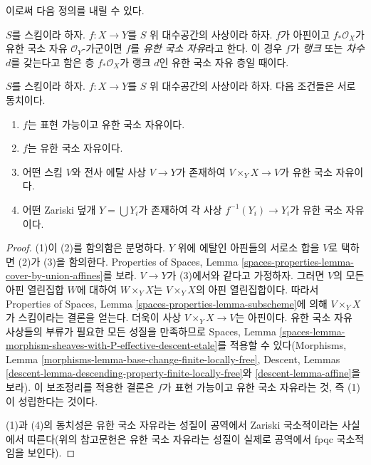 \noindent
이로써 다음 정의를 내릴 수 있다.

\begin{definition}
\label{definition-finite-locally-free}
$S$를 스킴이라 하자.
$f : X \to Y$를 $S$ 위 대수공간의 사상이라 하자.
$f$가 아핀이고 $f_*\mathcal{O}_X$가 유한 국소 자유
$\mathcal{O}_Y$-가군이면 $f$를 {\it 유한 국소 자유}라고 한다.
이 경우 $f$가 {\it 랭크} 또는 {\it 차수} $d$를 갖는다고 함은 층
$f_*\mathcal{O}_X$가 랭크 $d$인 유한 국소 자유 층일 때이다.
\end{definition}

\begin{lemma}
\label{lemma-finite-locally-free-local}
$S$를 스킴이라 하자.
$f : X \to Y$를 $S$ 위 대수공간의 사상이라 하자.
다음 조건들은 서로 동치이다.
\begin{enumerate}
\item $f$는 표현 가능이고 유한 국소 자유이다.
\item $f$는 유한 국소 자유이다.
\item 어떤 스킴 $V$와 전사 에탈 사상 $V \to Y$가 존재하여
$V \times_Y X \to V$가 유한 국소 자유이다.
\item 어떤 Zariski 덮개 $Y = \bigcup Y_i$가 존재하여 각 사상
$f^{-1}(Y_i) \to Y_i$가 유한 국소 자유이다.
\end{enumerate}
\end{lemma}

\begin{proof}
(1)이 (2)를 함의함은 분명하다. $Y$ 위에 에탈인 아핀들의 서로소 합을
$V$로 택하면 (2)가 (3)을 함의한다. Properties of Spaces, Lemma
\ref{spaces-properties-lemma-cover-by-union-affines}를 보라.
$V \to Y$가 (3)에서와 같다고 가정하자. 그러면 $V$의 모든 아핀 열린집합
$W$에 대하여 $W \times_Y X$는 $V \times_Y X$의 아핀 열린집합이다.
따라서 Properties of Spaces, Lemma
\ref{spaces-properties-lemma-subscheme}에 의해 $V \times_Y X$가 스킴이라는
결론을 얻는다. 더욱이 사상 $V \times_Y X \to V$는 아핀이다.
유한 국소 자유 사상들의 부류가 필요한 모든 성질을 만족하므로 Spaces,
Lemma \ref{spaces-lemma-morphism-sheaves-with-P-effective-descent-etale}를
적용할 수 있다(Morphisms, Lemma
\ref{morphisms-lemma-base-change-finite-locally-free}, Descent, Lemmas
\ref{descent-lemma-descending-property-finite-locally-free}와
\ref{descent-lemma-affine}을 보라). 이 보조정리를 적용한 결론은 $f$가
표현 가능이고 유한 국소 자유라는 것, 즉 (1)이 성립한다는 것이다.

\medskip\noindent
(1)과 (4)의 동치성은 유한 국소 자유라는 성질이 공역에서 Zariski
국소적이라는 사실에서 따른다(위의 참고문헌은 유한 국소 자유라는
성질이 실제로 공역에서 fpqc 국소적임을 보인다).
\end{proof}

